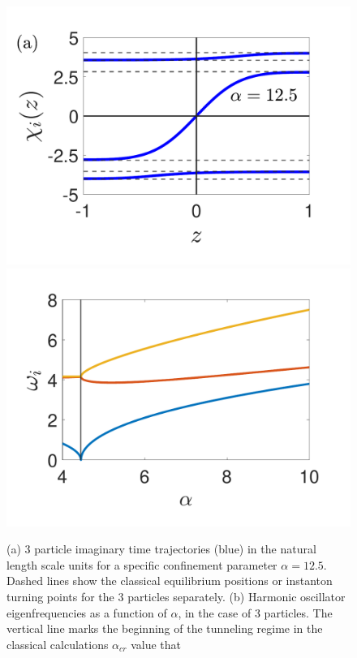 \documentclass[prb,twocolumn,showpacs,preprintnumbers,amsmath,amssymb, superscriptaddress]{revtex4-2}
\newcommand{\1}{{1\hspace*{-0.5ex} \textrm{l} \hspace*{0.5ex}}}
\begin{document}
 \begin{figure}[h!]
    \begin{center}
    	\includegraphics[width=0.49\columnwidth]{Fig_3Particle_Trajectory}
     	\includegraphics[width=0.49\columnwidth]{SupMatFig_Freqs.pdf}

     \caption{(a) 3 particle imaginary time trajectories (blue) in the natural length scale units for a specific confinement parameter $\alpha = 12.5$. Dashed lines show the classical equilibrium positions or instanton turning points for the 3 particles separately. (b) Harmonic oscillator eigenfrequencies as a function of $\alpha$, in the case of 3 particles. The vertical line marks the beginning of the tunneling regime in the classical calculations $\alpha_{cr}$ value that}
     \label{fig:experimental_setup}
    \end{center}
\end{figure}  
\end{document}
